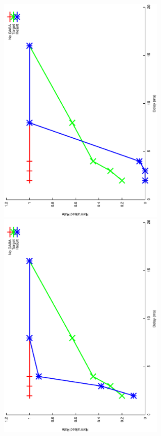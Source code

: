 \documentclass{article}
\begin{document}
\includegraphics[keepaspectratio=true,angle=-90,width=0.6\textwidth]{DS_ClickRecovery_result.0.eps}\clearpage
\includegraphics[keepaspectratio=true,angle=-90,width=0.6\textwidth]{DS_ClickRecovery_result.1.eps}\clearpage
\end{document}
